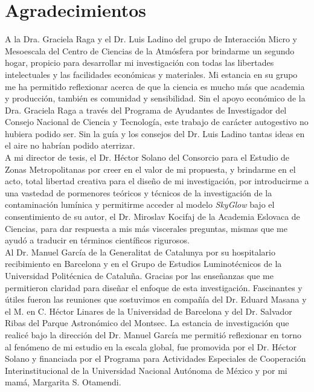 \chapter{Agradecimientos}

A la Dra. Graciela Raga y el Dr. Luis Ladino del grupo de Interacción Micro y Mesoescala del Centro de Ciencias de la Atmósfera por brindarme un segundo hogar, propicio para desarrollar mi investigación con todas las libertades intelectuales y las facilidades económicas y materiales. Mi estancia en su grupo me ha permitido reflexionar acerca de que la ciencia es mucho más que academia y producción, también es comunidad y sensibilidad. Sin el apoyo económico de la Dra. Graciela Raga a través del Programa de Ayudantes de Investigador del Consejo Nacional de Ciencia y Tecnología, este trabajo de carácter autogestivo no hubiera podido ser. Sin la guía y los consejos del Dr. Luis Ladino tantas ideas en el aire no habrían podido aterrizar.\\

A mi director de tesis, el Dr. Héctor Solano del Consorcio para el Estudio de Zonas Metropolitanas por creer en el valor de mi propuesta, y brindarme en el acto, total libertad creativa para el diseño de mi investigación, por introducirme a una vastedad de pormenores teóricos y técnicos de la investigación de la contaminación lumínica y permitirme acceder al modelo \textit{SkyGlow} bajo el consentimiento de su autor, el Dr. Miroslav Kocifaj de la Academia Eslovaca de Ciencias, para dar respuesta a mis más viscerales preguntas, mismas que me ayudó a traducir en términos científicos rigurosos.\\

Al Dr. Manuel García de la Generalitat de Catalunya por su hospitalario recibimiento en Barcelona y en el Grupo de Estudios Luminotécnicos de la Universidad Politécnica de Cataluña. Gracias por las enseñanzas que me permitieron claridad para diseñar el enfoque de esta investigación. Fascinantes y útiles fueron las reuniones que sostuvimos en compañía del Dr. Eduard Masana y el M. en C. Héctor Linares de la Universidad de Barcelona y del Dr. Salvador Ribas del Parque Astronómico del Montsec. La estancia de investigación que realicé bajo la dirección del Dr. Manuel García me permitió reflexionar en torno al fenómeno de mi estudio en la escala global, fue promovida por el Dr. Héctor Solano y financiada por el Programa para Actividades Especiales de Cooperación Interinstitucional de la Universidad Nacional Autónoma de México y por mi mamá, Margarita S. Otamendi.\\


